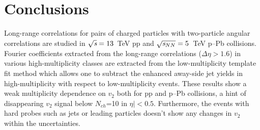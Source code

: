 
\section{Conclusions}
\label{sec:summary}
Long-range correlations for pairs of charged particles with two-particle angular correlations are studied in ${\sqrt{{\textit s}}}=13$~TeV pp and ${\sqrt{{\textit s_{NN}}}}=5$~TeV p--Pb collisions. Fourier coefficients extracted from the long-range correlations ($\Delta\eta > 1.6$) in various high-multiplicity classes are extracted from the low-multiplicity template fit method which allows one to subtract the enhanced away-side jet yields in high-multiplicity with respect to low-multiplicity events. These results show a weak multiplicity dependence on $v_2$ both for pp and p--Pb collisions, a hint of disappearing $v_2$ signal below $N_{ch}$=10 in $\eta|<0.5$. Furthermore, the events with hard probes such as jets or leading particles doesn't show any changes in $v_2$ within the uncertainties.